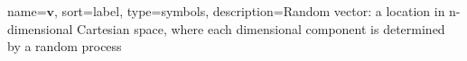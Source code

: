 






{
name={$\mathbf{v}$},
sort={label},
type=symbols,
description={Random vector: a location in n-dimensional Cartesian space, where each dimensional component is determined by a random process}
}